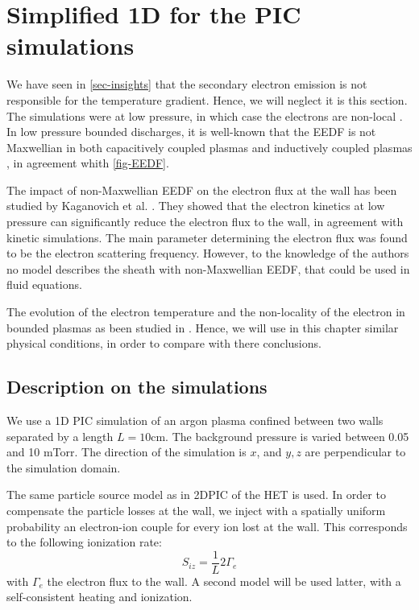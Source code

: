 


\section{Simplified 1D for the PIC simulations}
\label{sec-1DPIC}

We have seen in \cref{sec-insights} that the secondary electron emission is not responsible for the temperature gradient.
Hence, we will neglect it is this section.
The simulations were at low pressure, in which case  the electrons are non-local \cite{bernstein1954, godyak1993}.
In low pressure bounded discharges, it is well-known that the EEDF is not Maxwellian in both capacitively coupled plasmas and inductively coupled plasmas \cite{mouchtouris2016, godyak2002, meige2006a, dominguez-vazquez2018}, in agreement whith \vref{fig-EEDF}.

The impact of non-Maxwellian EEDF on the electron flux at the wall has been studied by Kaganovich et al. \citep{kaganovich2000,kaganovich2007}.
They showed that the electron kinetics at low pressure can significantly reduce the electron flux to the wall, in agreement with kinetic simulations.
The main parameter determining the electron flux was found to be the electron scattering frequency.
However, to the knowledge of the authors no model describes the sheath with non-Maxwellian EEDF, that could be used in fluid equations.

The evolution of the electron temperature and the non-locality of the electron in bounded plasmas as been studied in \citet{meige2006a}.
Hence, we will use in this chapter similar physical conditions, in order to compare with there conclusions.

\subsection{Description on the simulations}

We use a 1D PIC simulation of an argon plasma confined between two walls separated by a length $L=10$cm.
The background pressure is varied between 0.05 and 10 mTorr.
The direction of the simulation is $x$, and $y,z$ are perpendicular to the simulation domain.

The same particle source model as in \ac{2D}\ac{PIC} of the \ac{HET} is used.
In order to compensate the particle losses at the wall, we inject with a spatially uniform probability an electron-ion couple for every ion lost at the wall.
This corresponds to the following ionization rate:
\begin{equation}
  S_{iz} = \frac{1}{L} 2 \Gamma_e
\end{equation}
with $\Gamma_e$ the electron flux to the wall.
A second model will be used latter, with a self-consistent heating and ionization.


